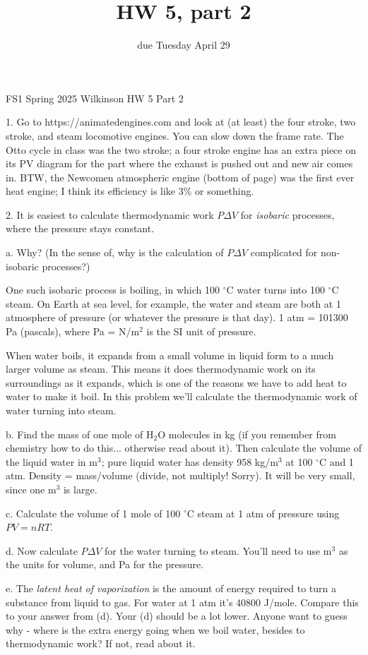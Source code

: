 \documentclass[12pt]{article}
\title{HW 5, part 2}
\date{due Tuesday April 29}
\begin{document}
\setlength{\parindent}{0pt}
\setlength{\parskip}{3mm}

FS1 Spring 2025 Wilkinson
HW 5 Part 2

1. Go to https://animatedengines.com and look at (at least) the four stroke, two stroke, and steam locomotive engines. You can slow down the frame rate. The Otto cycle in class was the two stroke; a four stroke engine has an extra piece on its PV diagram for the part where the exhaust is pushed out and new air comes in. BTW, the Newcomen atmospheric engine (bottom of page) was the first ever heat engine; I think its efficiency is like 3\% or something.

2. It is easiest to calculate thermodynamic work $P\Delta V$ for \textit{isobaric} processes, where the pressure stays constant.

a. Why? (In the sense of, why is the calculation of $P\Delta V$ complicated for non-isobaric processes?)

One such isobaric process is boiling, in which 100 $^{\circ}$C water turns into 100 $^{\circ}$C steam. On Earth at sea level, for example, the water and steam are both at 1 atmosphere of pressure (or whatever the pressure is that day). 1 atm = 101300 Pa (pascals), where Pa = N/m$^2$ is the SI unit of pressure.

When water boils, it expands from a small volume in liquid form to a much larger volume as steam. This means it does thermodynamic work on its surroundings as it expands, which is one of the reasons we have to add heat to water to make it boil. In this problem we'll calculate the thermodynamic work of water turning into steam.

b. Find the mass of one mole of H$_2$O molecules in kg (if you remember from chemistry how to do this... otherwise read about it). Then calculate the volume of the liquid water in m$^3$; pure liquid water has density 958 kg/m$^3$ at 100 $^{\circ}$C and 1 atm. Density = mass/volume (divide, not multiply! Sorry). It will be very small, since one m$^3$ is large. 

c. Calculate the volume of 1 mole of 100 $^{\circ}$C steam at 1 atm of pressure using $PV=nRT$. 

d. Now calculate $P\Delta V$ for the water turning to steam. You'll need to use m$^3$ as the units for volume, and Pa for the pressure.

e. The \textit{latent heat of vaporization} is the amount of energy required to turn a substance from liquid to gas. For water at 1 atm it's 40800 J/mole. Compare this to your answer from (d). Your (d) should be a lot lower. Anyone want to guess why - where is the extra energy going when we boil water, besides to thermodynamic work? If not, read about it.
\end{document}
